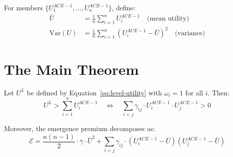 \begin{definition}
\label{def:utility-stats}
For members $\{U^{ACE-1}_1, \ldots, U^{ACE-1}_n\}$, define:
\begin{align}
\bar{U} &= \frac{1}{n} \sum_{i=1}^{n} U^{ACE-1}_i \quad \text{(mean utility)} \\
\text{Var}(U) &= \frac{1}{n} \sum_{i=1}^{n} (U^{ACE-1}_i - \bar{U})^2 \quad \text{(variance)}
\end{align}
\end{definition}


\section{The Main Theorem}
\label{sec:let-theorem}

\begin{theorem}
\label{thm:let}
Let $U^L$ be defined by Equation~\ref{eq:level-utility} with $\omega_i = 1$ for all $i$.
Then:
\begin{equation}
U^L > \sum_{i=1}^{n} U^{ACE-1}_i \quad \Longleftrightarrow \quad \sum_{i<j} \gamma_{ij} \cdot U^{ACE-1}_i \cdot U^{ACE-1}_j > 0
\label{eq:let-condition}
\end{equation}

Moreover, the emergence premium decomposes as:
\begin{equation}
\boxed{\mathcal{E} = \frac{n(n-1)}{2} \cdot \bar{\gamma} \cdot \bar{U}^2 + \sum_{i<j} \gamma_{ij} \cdot (U^{ACE-1}_i - \bar{U})(U^{ACE-1}_j - \bar{U})}
\label{eq:emergence-decomposition}
\end{equation}
\end{theorem}

